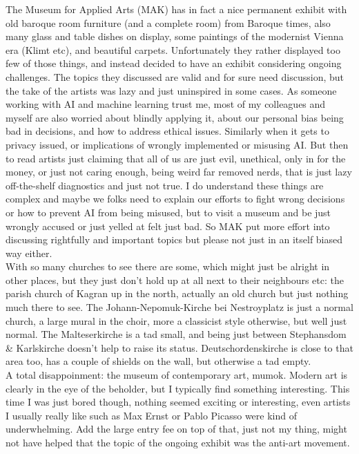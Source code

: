 The Museum for Applied Arts (MAK) has in fact a nice permanent exhibit with old baroque room furniture (and a complete room) from Baroque times, also many glass and table dishes on display, some paintings of the modernist Vienna era (Klimt etc), and beautiful carpets. Unfortunately they rather displayed too few of those things, and instead decided to have an exhibit considering ongoing challenges. The topics they discussed are valid and for sure need discussion, but the take of the artists was lazy and just uninspired in some cases. As someone working with AI and machine learning trust me, most of my colleagues and myself are also worried about blindly applying it, about our personal bias being bad in decisions, and how to address ethical issues. Similarly when it gets to privacy issued, or implications of wrongly implemented or misusing AI. But then to read artists just claiming that all of us are just evil, unethical, only in for the money, or just not caring enough, being weird far removed nerds, that is just lazy off-the-shelf diagnostics and just not true. I do understand these things are complex and maybe we folks need to explain our efforts to fight wrong decisions or how to prevent AI from being misused, but to visit a museum and be just wrongly accused or just yelled at felt just bad. So MAK put more effort into discussing rightfully and important topics but please not just in an itself biased way either.\\

With so many churches to see there are some, which might just be alright in other places, but they just don't hold up at all next to their neighbours etc: the parish church of Kagran up in the north, actually an old church but just nothing much there to see. The Johann-Nepomuk-Kirche bei Nestroyplatz is just a normal church, a large mural in the choir, more a classicist style otherwise, but well just normal. The Malteserkirche is a tad small, and being just between Stephansdom \& Karlskirche doesn't help to raise its status. Deutschordenskirche is close to that area too, has a couple of shields on the wall, but otherwise a tad empty.\\

A total disappoinment: the museum of contemporary art, mumok. Modern art is clearly in the eye of the beholder, but I typically find something interesting. This time I was just bored though, nothing seemed exciting or interesting, even artists I usually really like such as Max Ernst or Pablo Picasso were kind of underwhelming. Add the large entry fee on top of that, just not my thing, might not have helped that the topic of the ongoing exhibit was the anti-art movement.\\

